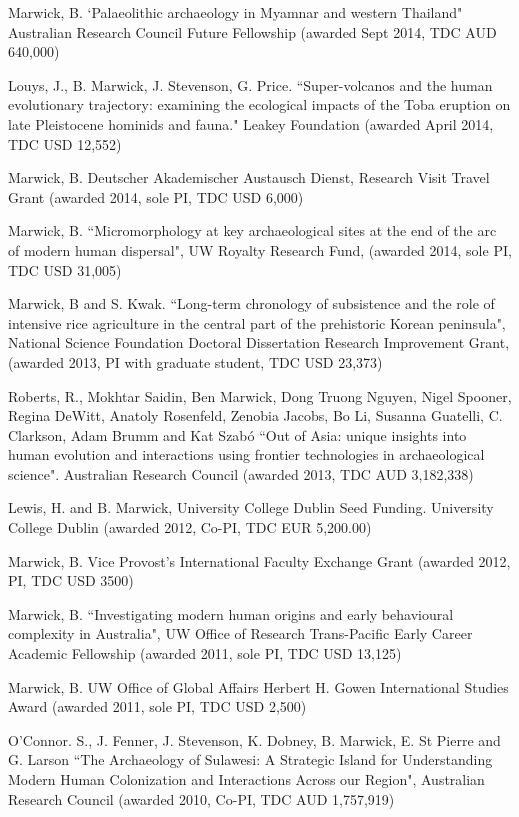\medskip

\ind  Marwick, B. `Palaeolithic archaeology in Myamnar and western Thailand" Australian Research Council Future Fellowship (awarded Sept 2014, TDC AUD 640,000)

\ind  Louys, J., B. Marwick, J. Stevenson, G. Price. ``Super-volcanos and the human evolutionary trajectory: examining the ecological impacts of the Toba eruption on late Pleistocene hominids and fauna." Leakey Foundation (awarded April 2014, TDC USD 12,552)

\ind  Marwick, B. Deutscher Akademischer Austausch Dienst, Research Visit Travel Grant (awarded 2014, sole PI, TDC USD 6,000)

\ind  Marwick, B. ``Micromorphology at key archaeological sites at the end of the arc of modern human dispersal", UW Royalty Research Fund, (awarded 2014, sole PI, TDC USD 31,005)

\ind  Marwick, B and S. Kwak. ``Long-term chronology of subsistence and the role of intensive rice agriculture in the central part of the prehistoric Korean peninsula", National Science Foundation Doctoral Dissertation Research Improvement Grant, (awarded 2013,  PI with graduate student, TDC USD 23,373)

\ind  Roberts, R., Mokhtar Saidin, Ben Marwick, Dong Truong Nguyen, Nigel Spooner, Regina DeWitt, Anatoly Rosenfeld, Zenobia Jacobs, Bo Li, Susanna Guatelli, C. Clarkson, Adam Brumm and Kat Szabó ``Out of Asia: unique insights into human evolution and interactions using frontier technologies in archaeological science".  Australian Research Council (awarded 2013, TDC AUD 3,182,338)

\ind Lewis, H. and B. Marwick,  University College Dublin Seed Funding. University College Dublin (awarded 2012, Co-PI, TDC EUR 5,200.00) 

\ind Marwick, B. Vice Provost’s International Faculty Exchange Grant (awarded 2012, PI, TDC USD 3500)

\ind  Marwick, B. ``Investigating modern human origins and early behavioural complexity in Australia", UW Office of Research Trans-Pacific Early Career Academic Fellowship (awarded 2011, sole PI, TDC USD 13,125)

\ind Marwick, B. UW Office of Global Affairs Herbert H. Gowen International Studies Award (awarded 2011, sole PI, TDC USD 2,500)

\ind O’Connor. S., J. Fenner, J. Stevenson, K. Dobney, B. Marwick, E. St Pierre and G. Larson ``The Archaeology of Sulawesi: A Strategic Island for Understanding Modern Human Colonization and Interactions Across our Region", Australian Research Council (awarded 2010, Co-PI, TDC AUD 1,757,919)

